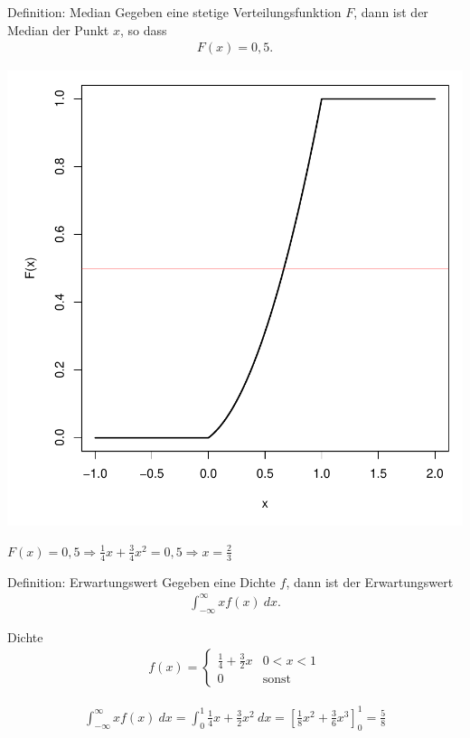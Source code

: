 \documentclass[t,11pt]{beamer}
\begin{document}
\begin{frame}
\begin{alertblock}{Definition: Median}
	Gegeben eine stetige Verteilungsfunktion $F$, dann ist der Median der Punkt $x$, so dass 
	\begin{align*}
	F(x) = 0,5.
	\end{align*}
\end{alertblock}
\begin{center}
	\includegraphics[scale=0.25]{Fx3.pdf}
\end{center}
$F(x)=0,5 \Rightarrow \frac{1}{4}x + \frac{3}{4}x^2 = 0,5 \Rightarrow x=\frac{2}{3}$
\end{frame}

\begin{frame}
\begin{alertblock}{Definition: Erwartungswert}
	Gegeben eine Dichte $f$, dann ist der Erwartungswert
	\begin{align*}
	\int_{-\infty}^{\infty} xf(x)~dx.
	\end{align*}
\end{alertblock}
\begin{block}{Dichte}
	\vspace{-0.5cm}
	\begin{align*}
	f(x)=\begin{cases}
	\frac{1}{4}+\frac{3}{2} x & 0<x<1\\
	0 & \text{sonst}
	\end{cases}
	\end{align*}
\end{block}
\begin{align*}
	\int_{-\infty}^{\infty} xf(x)~dx = \int_{0}^{1} \frac{1}{4}x+\frac{3}{2}x^2~dx=\left[ \frac{1}{8}x^2 + \frac{3}{6}x^3  \right]_0^1 = \frac{5}{8} 
\end{align*}

\end{frame}
\end{document}
